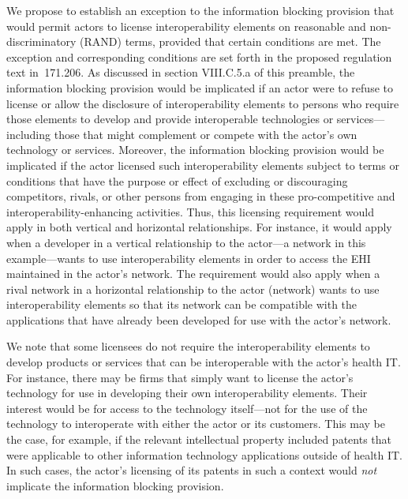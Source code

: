 \documentclass[twoside,11pt]{article}
\begin{document}
          We propose to establish an exception to the information blocking provision that would permit actors to license interoperability elements on reasonable and non-discriminatory (RAND) terms, provided that certain conditions are met. The exception and corresponding conditions are set forth in the proposed regulation text in \textsection{} 171.206. As discussed in section VIII.C.5.a of this preamble, the information blocking provision would be implicated if an actor were to refuse to license or allow the disclosure of interoperability elements to persons who require those elements to develop and provide interoperable technologies or services—including those that might complement or compete with the actor's own technology or services. Moreover, the information blocking provision would be implicated if the actor licensed such interoperability elements subject to terms or conditions that have the purpose or effect of excluding or discouraging competitors, rivals, or other persons from engaging in these pro-competitive and interoperability-enhancing activities. Thus, this licensing requirement would apply in both vertical and horizontal relationships. For instance, it would apply when a developer in a vertical relationship to the actor—a network in this example—wants to use interoperability elements in order to access the EHI maintained in the actor's network. The requirement would also apply when a rival network in a horizontal relationship to the actor (network) wants to use interoperability elements so that its network can be compatible with the applications that have already been developed for use with the actor's network.



          We note that some licensees do not require the interoperability elements to develop products or services that can be interoperable with the actor's health IT. For instance, there may be firms that simply want to license the actor's technology for use in developing their own interoperability elements. Their interest would be for access to the technology itself—not for the use of the technology to interoperate with either the actor or its customers. This may be the case, for example, if the relevant intellectual property included patents that were applicable to other information technology applications outside of health IT. In such cases, the actor's licensing of its patents in such a  \ifhmode\expandafter\xspace\fi context would \emph{not} implicate the information blocking provision.
\end{document}
